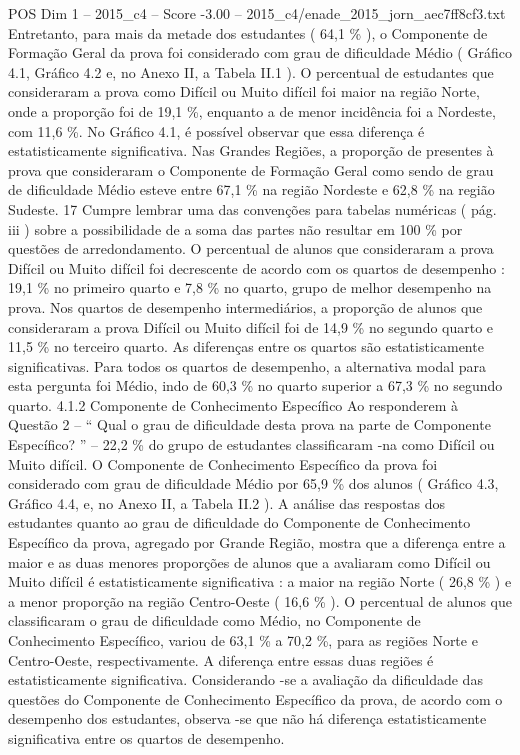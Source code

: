 \begin{textsample}{POS Dim 1 – 2015\_c4 – Score -3.00 – 2015\_c4/enade\_2015\_jorn\_aec7ff8cf3.txt}
Entretanto, para mais da metade dos estudantes ( 64,1 \% ), o Componente de Formação Geral da prova foi considerado com grau de dificuldade Médio ( Gráfico 4.1, Gráfico 4.2 e, no Anexo II, a Tabela II.1 ).
O percentual de estudantes que consideraram a prova como Difícil ou Muito difícil foi maior na região Norte, onde a proporção foi de 19,1 \%, enquanto a de menor incidência foi a Nordeste, com 11,6 \%.
No Gráfico 4.1, é possível observar que essa diferença é estatisticamente significativa.
Nas Grandes Regiões, a proporção de presentes à prova que consideraram o Componente de Formação Geral como sendo de grau de dificuldade Médio esteve entre 67,1 \% na região Nordeste e 62,8 \% na região Sudeste. 17 Cumpre lembrar uma das convenções para tabelas numéricas ( pág. iii ) sobre a possibilidade de a soma das partes não resultar em 100 \% por questões de arredondamento.
O percentual de alunos que consideraram a prova Difícil ou Muito difícil foi decrescente de acordo com os quartos de desempenho : 19,1 \% no primeiro quarto e 7,8 \% no quarto, grupo de melhor desempenho na prova.
Nos quartos de desempenho intermediários, a proporção de alunos que consideraram a prova Difícil ou Muito difícil foi de 14,9 \% no segundo quarto e 11,5 \% no terceiro quarto.
As diferenças entre os quartos são estatisticamente significativas.
Para todos os quartos de desempenho, a alternativa modal para esta pergunta foi Médio, indo de 60,3 \% no quarto superior a 67,3 \% no segundo quarto. 4.1.2 Componente de Conhecimento Específico Ao responderem à Questão 2 – “ Qual o grau de dificuldade desta prova na parte de Componente Específico? ” – 22,2 \% do grupo de estudantes classificaram -na como Difícil ou Muito difícil.
O Componente de Conhecimento Específico da prova foi considerado com grau de dificuldade Médio por 65,9 \% dos alunos ( Gráfico 4.3, Gráfico 4.4, e, no Anexo II, a Tabela II.2 ).
A análise das respostas dos estudantes quanto ao grau de dificuldade do Componente de Conhecimento Específico da prova, agregado por Grande Região, mostra que a diferença entre a maior e as duas menores proporções de alunos que a avaliaram como Difícil ou Muito difícil é estatisticamente significativa : a maior na região Norte ( 26,8 \% ) e a menor proporção na região Centro-Oeste ( 16,6 \% ).
O percentual de alunos que classificaram o grau de dificuldade como Médio, no Componente de Conhecimento Específico, variou de 63,1 \% a 70,2 \%, para as regiões Norte e Centro-Oeste, respectivamente.
A diferença entre essas duas regiões é estatisticamente significativa.
Considerando -se a avaliação da dificuldade das questões do Componente de Conhecimento Específico da prova, de acordo com o desempenho dos estudantes, observa -se que não há diferença estatisticamente significativa entre os quartos de desempenho.

\end{textsample}
